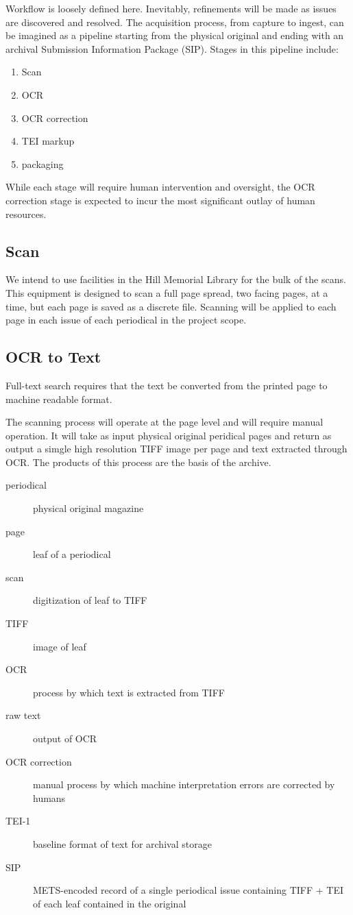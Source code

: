Workflow is loosely defined here. Inevitably, refinements will be made as issues are discovered and resolved. The acquisition process, from capture to ingest, can be imagined as a pipeline starting from the physical original and ending with an archival Submission Information Package (SIP). Stages in this pipeline include: 
\begin{enumerate}
  \item{Scan}
  \item{OCR}
  \item{OCR correction}
  \item{TEI markup}
  \item{packaging}
\end{enumerate}
While each stage will require human intervention and oversight, the OCR correction stage is expected to incur the most significant outlay of human resources. 
\subsection{Scan}
We intend to use facilities in the Hill Memorial Library for the bulk of the scans. This equipment is designed to scan a full page spread, two facing pages, at a time, but each page is saved as a discrete file. Scanning will be applied to each page in each issue of each periodical in the project scope.
\subsection{OCR to Text}
Full-text search requires that the text be converted from the printed page to machine readable format.


The scanning process will operate at the page level and will require manual operation. It will take as input physical original peridical pages and return as output a simgle high resolution TIFF image per page and text extracted through OCR. The products of this process are the basis of the archive.
\begin{description}
  \item[periodical]{physical original magazine}
  \item[page]{leaf of a periodical}
  \item[scan]{digitization of leaf to TIFF}
  \item[TIFF]{image of leaf}
  \item[OCR]{process by which text is extracted from TIFF}
  \item[raw text]{output of OCR}
  \item[OCR correction]{manual process by which machine interpretation errors are corrected by humans}
  \item[TEI-1]{baseline format of text for archival storage}
  \item[SIP]{METS-encoded record of a single periodical issue containing TIFF + TEI of each leaf contained in the original}
\end{description}

